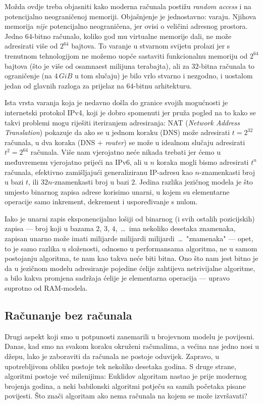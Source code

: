 Možda ovdje treba objasniti kako moderna računala postižu \emph{random access} i na potencijalno neograničenoj memoriji. Objašnjenje je jednostavno: varaju. Njihova memorija \emph{nije} potencijalno neograničena, jer ovisi o veličini adresnog prostora. Jedno $64$-bitno računalo, koliko god mu virtualne memorije dali, ne može adresirati više od $2^{64}$ bajtova. To varanje u stvarnom svijetu prolazi jer s trenutnom tehnologijom ne možemo uopće sastaviti funkcionalnu memoriju od $2^{64}$ bajtova (što je više od osamnaest milijuna terabajta), ali za $32$-bitna računala to ograničenje (na $4\,GiB$ u tom slučaju) je bilo vrlo stvarno i nezgodno, i uostalom jedan od glavnih razloga za prijelaz na $64$-bitnu arhitekturu.

Ista vrsta varanja koja je nedavno došla do granice svojih mogućnosti je internetski protokol IPv4, koji je dobro spomenuti jer pruža pogled na to kako se takvi problemi mogu riješiti iteriranjem adresiranja: NAT (\emph{Network Address Translation}) pokazuje da ako se u jednom koraku (DNS) može adresirati $t=2^{32}$ računala, u dva koraka (DNS + \emph{router}) se može u idealnom slučaju adresirati $t^2=2^{64}$ računala. Više nam vjerojatno neće nikada trebati jer ćemo u međuvremenu vjerojatno prijeći na IPv6, ali u $n$ koraka mogli bismo adresirati $t^n$ računala, efektivno zamišljajući generaliziranu IP-adresu kao $n$-znamenkasti broj u bazi $t$, ili $32n$-znamenkasti broj u bazi $2$. Jedina razlika jezičnog modela je što umjesto binarnog zapisa adrese korisimo unarni, u kojem su elementarne operacije samo inkrement, dekrement i  uspoređivanje s nulom.

Iako je unarni zapis eksponencijalno lošiji od binarnog (i svih ostalih pozicijskih) zapisa --- broj koji u bazama $2$, $3$, $4$,~\ldots\ ima nekoliko desetaka znamenaka, zapisan unarno može imati milijarde milijardi milijardi~\ldots\ "znamenaka" --- opet, to je samo razlika u složenosti, odnosno u performansama algoritma, ne u samom postojanju algoritma, te nam kao takva neće biti bitna. Ono što nam jest bitno je da u jezičnom modelu adresiranje pojedine ćelije zahtijeva netrivijalne algoritme, a bilo kakva promjena sadržaja ćelije je elementarna operacija --- upravo suprotno od RAM-modela.

\subsection{Računanje bez računala}

Drugi aspekt koji smo u potpunosti zanemarili u brojevnom modelu je povijesni. Danas, kad smo na svakom koraku okruženi računalima, a većina nas jedno nosi u džepu, lako je zaboraviti da računala ne postoje oduvijek. Zapravo, u upotrebljivom obliku postoje tek nekoliko desetaka godina. S druge strane, algoritmi postoje već milenijima: Euklidov algoritam nastao je prije modernog brojenja godina, a neki babilonski algoritmi potječu sa samih početaka pisane povijesti. Što znači algoritam ako nema računala na kojem se može izvršavati?

